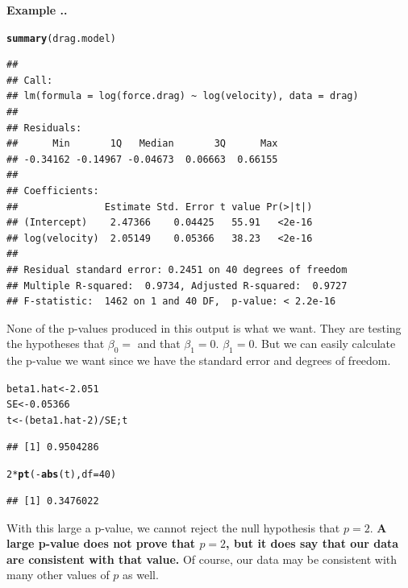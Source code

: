 \documentclass[twoside]{book}
\makeatletter
\newcommand{\hlnum}[1]{\textcolor[rgb]{0.686,0.059,0.569}{#1}}%
\newcommand{\hlopt}[1]{\textcolor[rgb]{0,0,0}{#1}}%
\newcommand{\hlstd}[1]{\textcolor[rgb]{0.345,0.345,0.345}{#1}}%
\newcommand{\hlkwb}[1]{\textcolor[rgb]{0.69,0.353,0.396}{#1}}%
\newcommand{\hlkwc}[1]{\textcolor[rgb]{0.333,0.667,0.333}{#1}}%
\newcommand{\hlkwd}[1]{\textcolor[rgb]{0.737,0.353,0.396}{\textbf{#1}}}%
\newenvironment{kframe}{%
 \def\at@end@of@kframe{}%
 \ifinner\ifhmode%
  \def\at@end@of@kframe{\end{minipage}}%
  \begin{minipage}{\columnwidth}%
 \fi\fi%
 \def\FrameCommand##1{\hskip\@totalleftmargin \hskip-\fboxsep
 \colorbox{shadecolor}{##1}\hskip-\fboxsep
     \hskip-\linewidth \hskip-\@totalleftmargin \hskip\columnwidth}%
 \MakeFramed {\advance\hsize-\width
   \@totalleftmargin\z@ \linewidth\hsize
   \@setminipage}}%
 {\par\unskip\endMakeFramed%
 \at@end@of@kframe}
\newenvironment{knitrout}{}{} %
\newcounter{example}[section]
\newenvironment{example}%
{\refstepcounter{example}%
\textbf{Example \thesection.\arabic{example}. }}%
{}
\makeatother
\begin{document}
\begin{example}
\begin{knitrout}
{}



\end{knitrout}

\begin{knitrout}
\color{fgcolor}\begin{kframe}
\begin{alltt}
\hlkwd{summary}\hlstd{(drag.model)}
\end{alltt}
\begin{verbatim}
## 
## Call:
## lm(formula = log(force.drag) ~ log(velocity), data = drag)
## 
## Residuals:
##      Min       1Q   Median       3Q      Max 
## -0.34162 -0.14967 -0.04673  0.06663  0.66155 
## 
## Coefficients:
##               Estimate Std. Error t value Pr(>|t|)
## (Intercept)    2.47366    0.04425   55.91   <2e-16
## log(velocity)  2.05149    0.05366   38.23   <2e-16
## 
## Residual standard error: 0.2451 on 40 degrees of freedom
## Multiple R-squared:  0.9734,	Adjusted R-squared:  0.9727 
## F-statistic:  1462 on 1 and 40 DF,  p-value: < 2.2e-16
\end{verbatim}
\end{kframe}
\end{knitrout}
None of the p-values produced in this output is what we want.  
They are testing the hypotheses that $\beta_0=$ and that $\beta_1 = 0$.
$\beta_1 = 0$.  
But we can easily calculate the p-value we want since we have the standard error
and degrees of freedom.
\begin{knitrout}
\color{fgcolor}\begin{kframe}
\begin{alltt}
\hlstd{beta1.hat} \hlkwb{<-} \hlnum{2.051}
\hlstd{SE} \hlkwb{<-} \hlnum{0.05366}
\hlstd{t} \hlkwb{<-}  \hlstd{( beta1.hat} \hlopt{-} \hlnum{2} \hlstd{)} \hlopt{/} \hlstd{SE; t}
\end{alltt}
\begin{verbatim}
## [1] 0.9504286
\end{verbatim}
\begin{alltt}
\hlnum{2} \hlopt{*} \hlkwd{pt}\hlstd{(} \hlopt{-} \hlkwd{abs}\hlstd{(t),} \hlkwc{df}\hlstd{=} \hlnum{40} \hlstd{)}
\end{alltt}
\begin{verbatim}
## [1] 0.3476022
\end{verbatim}
\end{kframe}
\end{knitrout}
With this large a p-value, we cannot reject the null hypothesis that $p=2$.
\textbf{A large p-value does not prove that $p=2$, 
but it does say that our data are consistent with that value.}  
Of course, our data may be consistent with many other values of $p$ as well.
\end{example}
\end{document}

